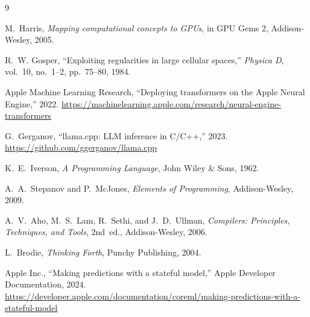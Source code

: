 \documentclass[11pt,twocolumn]{article}
\begin{document}
\begin{thebibliography}{9}

M.~Harris, \emph{Mapping computational concepts to GPUs},
in GPU Gems 2, Addison-Wesley, 2005.

R.~W. Gosper, ``Exploiting regularities in large cellular spaces,''
\emph{Physica D}, vol.~10, no.~1--2, pp.~75--80, 1984.

Apple Machine Learning Research, ``Deploying transformers on the Apple
Neural Engine,'' 2022.
\url{https://machinelearning.apple.com/research/neural-engine-transformers}

G.~Gerganov, ``llama.cpp: LLM inference in C/C++,'' 2023.
\url{https://github.com/ggerganov/llama.cpp}

K.~E.~Iverson, \emph{A Programming Language}, John Wiley \& Sons, 1962.

A.~A.~Stepanov and P.~McJones, \emph{Elements of Programming},
Addison-Wesley, 2009.

A.~V.~Aho, M.~S.~Lam, R.~Sethi, and J.~D.~Ullman, \emph{Compilers:
Principles, Techniques, and Tools}, 2nd~ed., Addison-Wesley, 2006.

L.~Brodie, \emph{Thinking Forth}, Punchy Publishing, 2004.

Apple Inc., ``Making predictions with a stateful model,''
Apple Developer Documentation, 2024.
\url{https://developer.apple.com/documentation/coreml/making-predictions-with-a-stateful-model}
\end{thebibliography}
\end{document}

